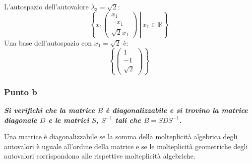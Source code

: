 \documentclass[a4paper]{article}
\begin{document}
	L'autospazio dell'autovalore $\lambda_{3} = \sqrt{2}$:
	\begin{equation*}
		\left\{\left. x_{1} \begin{pmatrix}
			x_{1} \\
			-x_{1} \\
			\sqrt{2}x_{1}
		\end{pmatrix} \: \right| \: x_{1} \in \mathbb{R}\right\}
	\end{equation*}
	Una base dell'autospazio con $x_{1} = \sqrt{2}$ è:
	\begin{equation*}
		\left\{\begin{pmatrix}
			1 \\ -1 \\ \sqrt{2}
		\end{pmatrix}\right\}
	\end{equation*}\newpage
	
	\subsubsection{Punto b}
	
	\textcolor{Green4}{\textbf{\emph{Si verifichi che la matrice $B$ è diagonalizzabile e si trovino la matrice diagonale $D$ e le matrici $S$, $S^{-1}$ tali che $B = SDS^{-1}$.}}}\newline
	
	\noindent
	Una matrice è diagonalizzabile se la somma della molteplicità algebrica degli autovalori è uguale all'ordine della matrice e se le molteplicità geometriche degli autovalori corrispondono alle rispettive molteplicità algebriche.\newline
	
\end{document}
